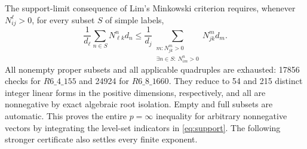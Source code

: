 \documentclass[10pt]{article}
\begin{document}
The support-limit consequence of Lim's Minkowski criterion requires, whenever $N_{ij}^{\ell}>0$, for every subset $S$ of simple labels,
\begin{equation}\label{eq:support}
 \frac1{d_\ell}\sum_{n\in S}N_{\ell k}^{n}d_n
 \le \frac1{d_j}\sum_{\substack{m:N_{jk}^{m}>0\\
                  \exists n\in S:\ N_{im}^{n}>0}}N_{jk}^{m}d_m.
\end{equation}
All nonempty proper subsets and all applicable quadruples are exhausted: 17856 checks for $R6\_4\_155$ and 24924 for $R6\_8\_1660$. They reduce to 54 and 215 distinct integer linear forms in the positive dimensions, respectively, and all are nonnegative by exact algebraic root isolation. Empty and full subsets are automatic. This proves the entire $p=\infty$ inequality for arbitrary nonnegative vectors by integrating the level-set indicators in \eqref{eq:support}. The following stronger certificate also settles every finite exponent.
\end{document}
